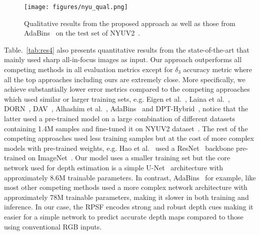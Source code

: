 \documentclass[preprint,5p,twocolumn]{elsarticle}
\begin{document}
\begin{figure*}[h!]
\centering
\texttt{[image: figures/nyu\_qual.png]}
\caption{Qualitative results from the proposed approach as well as those from AdaBins~\cite{bhat2020adabins} on the test set of NYUV2~\cite{eigen2015predicting}.}
\label{fig:nuy_qual}
\end{figure*}

Table.~\ref{tab:res4} also presents  quantitative results from the state-of-the-art that mainly used sharp all-in-focus images as input. Our approach outperforms all competing methods in all evaluation metrics except for $\delta_{3}$ accuracy metric where all the top approaches including ours are extremely close. More specifically, we achieve substantially lower error metrics compared to the competing approaches which used similar or larger training sets, e.g. Eigen et al.~\cite{eigen2015predicting}, Laina et al.~\cite{laina2016deeper}, DORN~\cite{fu2018deep}, DAV~\cite{huynh2020guiding}, Alhashim et al.~\cite{alhashim2018high},  AdaBins~\cite{bhat2020adabins} and DPT-Hybrid~\cite{ranftl2021vision}, notice that the latter used a pre-trained model on a large combination of different datasets containing 1.4M samples and fine-tuned it on NYUV2 dataset~\cite{eigen2015predicting}. The rest of the competing approaches used less training samples but at the cost of more complex models with pre-trained weights, e.g. Hao et al.~\cite{hao2018detail} used a ResNet~\cite{he2016deep} backbone pre-trained on ImageNet~\cite{deng2009imagenet}.
Our model uses a smaller training set but the core network used for depth estimation is a simple U-Net~\cite{ronneberger2015u} architecture with approximately 8.6M trainable parameters. In contrast, AdaBins~\cite{bhat2020adabins} for example, like most other competing methods used a more complex network architecture with approximately 78M trainable parameters, making it slower in both training and inference. In our case, the RPSF encodes strong and robust depth cues making it easier for a simple network to predict accurate depth maps compared to those using conventional RGB inputs. 
\end{document}
